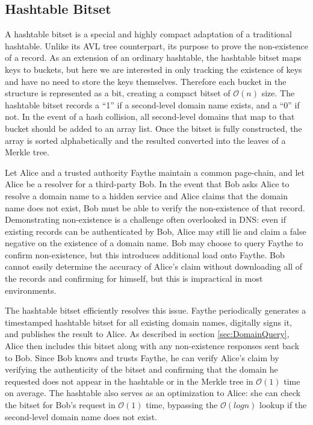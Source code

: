 \subsection{Hashtable Bitset}

A hashtable bitset is a special and highly compact adaptation of a traditional hashtable. Unlike its AVL tree counterpart, its purpose to prove the non-existence of a record. As an extension of an ordinary hashtable, the hashtable bitset maps keys to buckets, but here we are interested in only tracking the existence of keys and have no need to store the keys themselves. Therefore each bucket in the structure is represented as a bit, creating a compact bitset of $ \mathcal{O}(n) $ size. The hashtable bitset records a ``1'' if a second-level domain name exists, and a ``0'' if not. In the event of a hash collision, all second-level domains that map to that bucket should be added to an array list. Once the bitset is fully constructed, the array is sorted alphabetically and the resulted converted into the leaves of a Merkle tree.



Let Alice and a trusted authority Faythe maintain a common page-chain, and let Alice be a resolver for a third-party Bob. In the event that Bob asks Alice to resolve a domain name to a hidden service and Alice claims that the domain name does not exist, Bob must be able to verify the non-existence of that record. Demonstrating non-existence is a challenge often overlooked in DNS: even if existing records can be authenticated by Bob, Alice may still lie and claim a false negative on the existence of a domain name. Bob may choose to query Faythe to confirm non-existence, but this introduces additional load onto Faythe. Bob cannot easily determine the accuracy of Alice's claim without downloading all of the records and confirming for himself, but this is impractical in most environments.

The hashtable bitset efficiently resolves this issue. Faythe periodically generates a timestamped hashtable bitset for all existing domain names, digitally signs it, and publishes the result to Alice. As described in section \ref{sec:DomainQuery}, Alice then includes this bitset along with any non-existence responses sent back to Bob. Since Bob knows and trusts Faythe, he can verify Alice's claim by verifying the authenticity of the bitset and confirming that the domain he requested does not appear in the hashtable or in the Merkle tree in $ \mathcal{O}(1) $ time on average. The hashtable also serves as an optimization to Alice: she can check the bitset for Bob's request in $ \mathcal{O}(1) $ time, bypassing the $ \mathcal{O}(log n) $ lookup if the second-level domain name does not exist.

